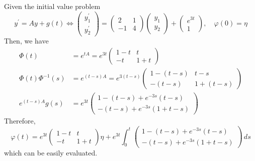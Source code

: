 \documentclass{article}
\newcounter{example}[section]
\begin{document}
    \begin{example}
      \label{ex:solving-a-nonhomogeneous-linear-system}
    Given the initial value problem 
    \begin{equation}
      y^\prime = Ay + g(t) \iff \begin{pmatrix} y_1 ^\prime \\ y_2^\prime \end{pmatrix} = \begin{pmatrix} 2 & 1 \\ -1 & 4 \end{pmatrix} \begin{pmatrix} y_1 \\ y_2 \end{pmatrix} + \begin{pmatrix} e^{3t} \\ 1 \end{pmatrix}, \quad \varphi(0) = \eta
    \end{equation}
    Then, we have
    \begin{align*}
        \Phi(t) & = e^{tA} = e^{3t} \begin{pmatrix} 1-t & t \\ -t & 1+t \end{pmatrix} \\
        \Phi(t) \Phi^{-1} (s) & = e^{(t-s)A} = e^{3(t-s)} \begin{pmatrix} 1 - (t-s) & t-s \\ -(t-s) & 1+(t-s) \end{pmatrix} \\
        e^{(t-s)A} g(s) & = e^{3t} \begin{pmatrix}
        1-(t-s)+e^{-3s}(t-s) \\ -(t-s) + e^{-3s} (1+t-s)\end{pmatrix}
    \end{align*}
    Therefore, 
    \begin{equation}
      \varphi(t) = e^{3t} \begin{pmatrix} 1-t & t \\ -t & 1+t \end{pmatrix} \eta + e^{3t} \int_{0}^t \begin{pmatrix} 1-(t-s) + e^{-3s} (t-s) \\
          -(t-s) + e^{-3s}(1+t-s) \end{pmatrix} \,ds
    \end{equation}
    which can be easily evaluated. 
    \end{example}
\end{document}
